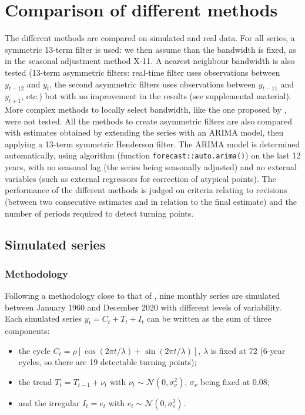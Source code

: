 \documentclass[
]{article}
\newcommand\1{\mathds{1}}
\begin{document}
\section{Comparison of different methods}\label{sec-comparison}

The different methods are compared on simulated and real data. For all
series, a symmetric 13-term filter is used: we then assume than the
bandwidth is fixed, as in the seasonal adjustment method X-11. A nearest
neighbour bandwidth is also tested (13-term asymmetric filters:
real-time filter uses observations between \(y_{t-12}\) and \(y_{t}\),
the second asymmetric filters uses observations between \(y_{t-11}\) and
\(y_{t+1}\), etc.) but with no improvement in the results (see
supplemental material). More complex methods to locally select
bandwidth, like the one proposed by \textcite{fan1992variable}, were not
tested. All the methods to create asymmetric filters are also compared
with estimates obtained by extending the series with an ARIMA model,
then applying a 13-term symmetric Henderson filter. The ARIMA model is
determined automatically, using \textcite{autoarima} algorithm (function
\texttt{forecast::auto.arima()}) on the last 12 years, with no seasonal
lag (the series being seasonally adjusted) and no external variables
(such as external regressors for correction of atypical points). The
performance of the different methods is judged on criteria relating to
revisions (between two consecutive estimates and in relation to the
final estimate) and the number of periods required to detect turning
points.

\subsection{Simulated series}\label{simulated-series}

\subsubsection{Methodology}\label{methodology}

Following a methodology close to that of \textcite{DarneDagum2009}, nine
monthly series are simulated between January 1960 and December 2020 with
different levels of variability. Each simulated series
\(y_t= C_t+ T_t + I_t\) can be written as the sum of three components:

\begin{itemize}
\item
  the cycle
  \(C_t = \rho [\cos (2 \pi t / \lambda) +\sin (2 \pi t / \lambda)]\),
  \(\lambda\) is fixed at 72 (6-year cycles, so there are 19 detectable
  turning points);
\item
  the trend \(T_t = T_{t-1} + \nu_t\) with
  \(\nu_t \sim \mathcal{N}(0, \sigma_\nu^2)\), \(\sigma_\nu\) being
  fixed at \(0.08\);
\item
  and the irregular \(I_t = e_t\) with
  \(e_t \sim \mathcal{N}(0, \sigma_e^2)\).
\end{itemize}
\end{document}
